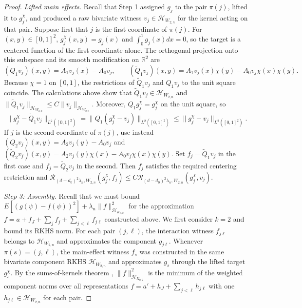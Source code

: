 \documentclass[letterpaper,12pt]{article}
\theoremstyle{definition}
\numberwithin{equation}{section}
\newcommand{\mr}{\mathbb{R}}
\newcommand{\mc}{\mathcal}
\newcommand{\norm}[1]{\lVert#1\rVert}
\begin{document}
\begin{proof}
\medskip

\emph{Lifted main effects.}
Recall that Step 1 assigned $g_j$ to the pair $\pi(j)$, lifted it to $g_j^\chi$, and produced a raw bivariate witness $v_j\in\mc H_{W_{2,n}}$ for the kernel acting on that pair.
Suppose first that $j$ is the first coordinate of $\pi(j)$.
For $(x,y)\in[0,1]^2$, $g_j^\chi(x,y)=g_j(x)$ and $\int_0^1g_j(x)dx=0$, so the target is a centered function of the first coordinate alone.
The orthogonal projection onto this subspace and its smooth modification on $\mr^2$ are
\begin{equation*}
(Q_1v_j)(x,y)=A_1v_j(x)-A_0v_j, \qquad (\widetilde Q_1v_j)(x,y)=A_1v_j(x)\chi(y)-A_0v_j\chi(x)\chi(y).
\end{equation*}
Because $\chi=1$ on $[0,1]$, the restrictions of $\widetilde Q_1v_j$ and $Q_1v_j$ to the unit square coincide.
The calculations above show that $\widetilde Q_1v_j\in\mc H_{W_{2,n}}$ and $\norm{\widetilde Q_1v_j}_{\mc H_{W_{2,n}}}\leq C\norm{v_j}_{\mc H_{W_{2,n}}}$.
Moreover, $Q_1g_j^\chi=g_j^\chi$ on the unit square, so
\begin{equation*}
\norm{g_j^\chi-\widetilde Q_1v_j}_{L^2([0,1]^2)}=\norm{Q_1(g_j^\chi-v_j)}_{L^2([0,1]^2)}\leq\norm{g_j^\chi-v_j}_{L^2([0,1]^2)}.
\end{equation*}
If $j$ is the second coordinate of $\pi(j)$, use instead $(Q_2v_j)(x,y)=A_2v_j(y)-A_0v_j$ and $(\widetilde Q_2v_j)(x,y)=A_2v_j(y)\chi(x)-A_0v_j\chi(x)\chi(y)$.
Set $f_j=\widetilde Q_1v_j$ in the first case and $f_j=\widetilde Q_2v_j$ in the second.
Then $f_j$ satisfies the required centering restriction and $\mathcal R_{(d-d_0)^2\lambda_n,W_{2,n}}(g_j^\chi,f_j)\leq C\mathcal R_{(d-d_0)^2\lambda_n,W_{2,n}}(g_j^\chi,v_j)$.

\medskip

\emph{Step 3: Assembly.}
Recall that we must bound $E[(g(\psi)-f(\psi))^2]+\lambda_n\norm{f}_{\mc H_{K_{n,k}}}^2$ for the approximation $f=a+f_J+\sum_jf_j+\sum_{j<\ell}f_{j\ell}$ constructed above.
We first consider $k=2$ and bound its RKHS norm.
For each pair $(j,\ell)$, the interaction witness $f_{j\ell}$ belongs to $\mc H_{W_{2,n}}$ and approximates the component $g_{j\ell}$.
Whenever $\pi(s)=(j,\ell)$, the main-effect witness $f_s$ was constructed in the same bivariate component RKHS $\mc H_{W_{2,n}}$ and approximates $g_s$ through the lifted target $g_s^\chi$.
By the sums-of-kernels theorem \citep[Theorem~5.4]{paulsen2016rkhs}, $\norm{f}_{\mc H_{K_{n,2}}}^2$ is the minimum of the weighted component norms over all representations $f=a'+h_J+\sum_{j<\ell}h_{j\ell}$ with one $h_{j\ell}\in\mc H_{W_{2,n}}$ for each pair.


\end{proof}
\end{document}
